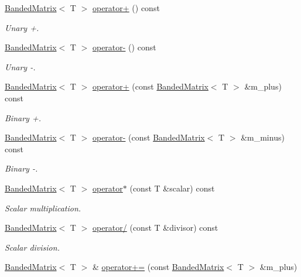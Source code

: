 \begin{DoxyCompactItemize}
\hyperlink{classLuna_1_1BandedMatrix}{Banded\+Matrix}$<$ T $>$ \hyperlink{classLuna_1_1BandedMatrix_a76611984fef082ce06e307fea390dc86}{operator+} () const
\begin{DoxyCompactList}\small\item\em Unary +. \end{DoxyCompactList}\item 
\hyperlink{classLuna_1_1BandedMatrix}{Banded\+Matrix}$<$ T $>$ \hyperlink{classLuna_1_1BandedMatrix_af4e0c5aeedec88bc7704243c1d965922}{operator-\/} () const
\begin{DoxyCompactList}\small\item\em Unary -\/. \end{DoxyCompactList}\item 
\hyperlink{classLuna_1_1BandedMatrix}{Banded\+Matrix}$<$ T $>$ \hyperlink{classLuna_1_1BandedMatrix_a56309b75d7eea8a11e47f0cae346fe5b}{operator+} (const \hyperlink{classLuna_1_1BandedMatrix}{Banded\+Matrix}$<$ T $>$ \&m\+\_\+plus) const
\begin{DoxyCompactList}\small\item\em Binary +. \end{DoxyCompactList}\item 
\hyperlink{classLuna_1_1BandedMatrix}{Banded\+Matrix}$<$ T $>$ \hyperlink{classLuna_1_1BandedMatrix_ae4728572d92875bf8eb405be5a298079}{operator-\/} (const \hyperlink{classLuna_1_1BandedMatrix}{Banded\+Matrix}$<$ T $>$ \&m\+\_\+minus) const
\begin{DoxyCompactList}\small\item\em Binary -\/. \end{DoxyCompactList}\item 
\hyperlink{classLuna_1_1BandedMatrix}{Banded\+Matrix}$<$ T $>$ \hyperlink{classLuna_1_1BandedMatrix_a7a180b6c7d99e329f9e250977b794a41}{operator$\ast$} (const T \&scalar) const
\begin{DoxyCompactList}\small\item\em Scalar multiplication. \end{DoxyCompactList}\item 
\hyperlink{classLuna_1_1BandedMatrix}{Banded\+Matrix}$<$ T $>$ \hyperlink{classLuna_1_1BandedMatrix_ae93fe94b20edf5b66e4041cf6862833b}{operator/} (const T \&divisor) const
\begin{DoxyCompactList}\small\item\em Scalar division. \end{DoxyCompactList}\item 
\hyperlink{classLuna_1_1BandedMatrix}{Banded\+Matrix}$<$ T $>$ \& \hyperlink{classLuna_1_1BandedMatrix_a4d5dfdb90246620ca7d3f7abae766d01}{operator+=} (const \hyperlink{classLuna_1_1BandedMatrix}{Banded\+Matrix}$<$ T $>$ \&m\+\_\+plus)

\end{DoxyCompactItemize}
